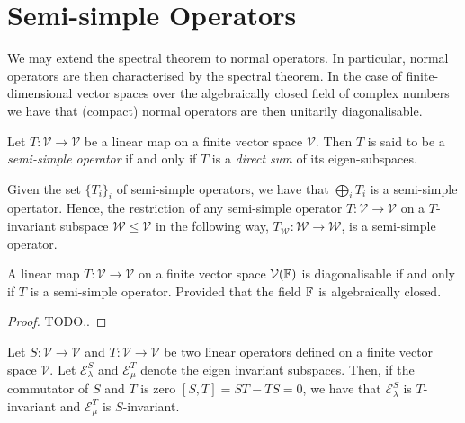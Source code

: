 
\section{Semi-simple Operators} %
\label{sec:semi-simple}

We may extend the spectral theorem to normal operators.
In particular, normal operators are then characterised
by the spectral theorem. In the case of finite-dimensional
vector spaces over the algebraically closed field of complex
numbers we have that (compact) normal operators are then
unitarily diagonalisable.

\begin{defn}
 Let $T : \mathcal{V} \to \mathcal{V}$ be a linear map on
 a finite vector space $\mathcal{V}$. Then $T$ is said to
 be a \emph{semi-simple operator} if and only if $T$ is
 a \emph{direct sum} of its eigen-subspaces.
\end{defn}

\begin{lem}
 Given the set $\{ T_i \}_i$ of semi-simple operators, we
 have that $\bigoplus_{i} T_i$ is a semi-simple opertator.
 Hence, the restriction of any semi-simple operator
 $T: \mathcal{V} \to \mathcal{V}$ on a $T$-invariant subspace
 $\mathcal{W} \leq \mathcal{V}$ in the following way,
 $T_{\mathcal{W}} : \mathcal{W} \to \mathcal{W}$, is a
 semi-simple operator.
\end{lem}

\begin{prop}
 A linear map $T : \mathcal{V} \to \mathcal{V}$ on a finite
 vector space $\mathcal{V}(\mathbb{F})$ is diagonalisable if and only
 if $T$ is a semi-simple operator. Provided that the field $\mathbb{F}$
 is algebraically closed.
\end{prop}

\begin{proof}
 TODO..
\end{proof}

\begin{prop}
 Let $S: \mathcal{V} \to \mathcal{V}$ and $T: \mathcal{V} \to \mathcal{V}$
 be two linear operators defined on a finite vector space $\mathcal{V}$.
 Let $\mathcal{E}_{\lambda}^{S}$ and $\mathcal{E}_{\mu}^{T}$ denote the
 eigen invariant subspaces. Then, if the commutator of $S$ and $T$ is
 zero $[S, T] = S T - T S = 0$, we have that $\mathcal{E}_{\lambda}^{S}$
 is $T$-invariant and $\mathcal{E}_{\mu}^{T}$ is $S$-invariant.
\end{prop}

